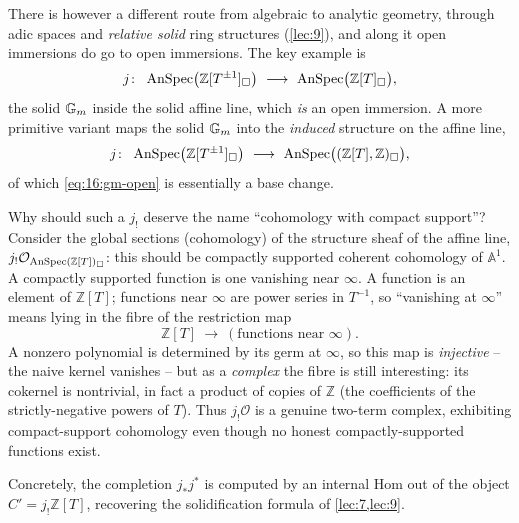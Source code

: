 \begin{example}
\label{ex:16:open-example}
There is however a different route from algebraic to analytic geometry, through adic
spaces and \emph{relative solid} ring structures (\cref{lec:9}), and along it open
immersions do go to open immersions. The key example is
\begin{equation}
\label{eq:16:gm-open}
j\colon\ \AnSpec\bigl(\mathbb{Z}[T^{\pm1}]_\solid\bigr)\ \longrightarrow\ \AnSpec\bigl(\mathbb{Z}[T]_\solid\bigr),
\end{equation}
the solid $\mathbb{G}_{m}$ inside the solid affine line, which \emph{is} an open immersion. A
more primitive variant maps the solid $\mathbb{G}_{m}$ into the \emph{induced} structure on the
affine line,
\begin{equation*}
j\colon\ \AnSpec\bigl(\mathbb{Z}[T^{\pm1}]_\solid\bigr)\ \longrightarrow\ \AnSpec\bigl((\mathbb{Z}[T],\mathbb{Z})_\solid\bigr),
\end{equation*}
of which \eqref{eq:16:gm-open} is essentially a base change.
\end{example}

\begin{remark}
\label{rmk:16:compact-support-picture}
Why should such a $j_!$ deserve the name ``cohomology with compact support''?
Consider the global sections (cohomology) of the structure sheaf of the affine line,
$j_!\mathcal{O}_{\operatorname{AnSpec}(\mathbb{Z}[T])_\square}$: this should be compactly supported
coherent cohomology of $\mathbb{A}^1$. A compactly supported function is one vanishing
near $\infty$. A function is an element of $\mathbb{Z}[T]$; functions near $\infty$ are
power series in $T^{-1}$, so ``vanishing at $\infty$'' means lying in the fibre of the
restriction map
\begin{equation*}
\mathbb{Z}[T]\ \longrightarrow\ (\text{functions near }\infty).
\end{equation*}
A nonzero polynomial is determined by its germ at $\infty$, so this map is
\emph{injective} -- the naive kernel vanishes -- but as a \emph{complex} the fibre is
still interesting: its cokernel is nontrivial, in fact a product of copies of
$\mathbb{Z}$ (the coefficients of the strictly-negative powers of $T$). Thus
$j_!\mathcal{O}$ is a genuine two-term complex, exhibiting compact-support cohomology
even though no honest compactly-supported functions exist.
\end{remark}

Concretely, the completion $j_*j^*$ is computed by an internal Hom out of the object
$C'=j_!\mathbb{Z}[T]$, recovering the solidification formula of \cref{lec:7,lec:9}.

